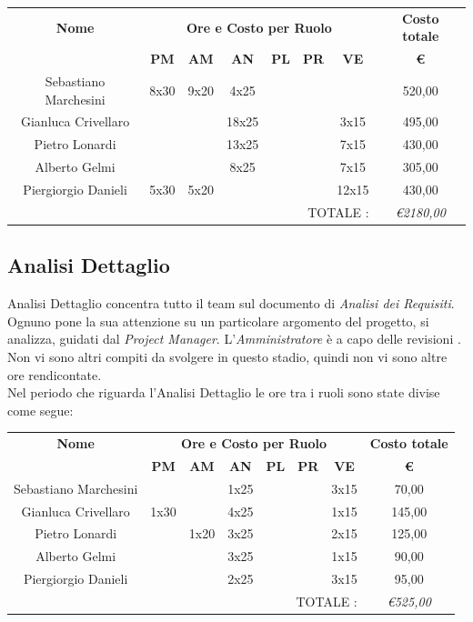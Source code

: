 \documentclass[12pt,a4paper,titlepage]{article}
\begin{document}
	{\renewcommand\arraystretch{1.2}  %
		\begin{tabular}{|c|c|c|c|c|c|c|c|}
			\hline 
			\textbf{Nome} & \multicolumn{6}{c|}{\textbf{Ore e Costo per Ruolo}} & \textbf{Costo totale} \\ 
			& \textbf{PM} & \textbf{AM} & \textbf{AN} & \textbf{PL} & \textbf{PR} & \textbf{VE} & \textbf{ \euro } \\ 
			\hline
			Sebastiano Marchesini & 8x30 & 9x20 & 4x25 &  &  &  & 520,00 \\ 
			\hline 
			Gianluca Crivellaro &  &  & 18x25 &  &  & 3x15 & 495,00  \\ 
			\hline 
			Pietro Lonardi &  &  & 13x25 &  &  & 7x15 & 430,00 \\ 
			\hline 
			Alberto Gelmi &  &  & 8x25 &  &  & 7x15 & 305,00 \\ 
			\hline 
			Piergiorgio Danieli & 5x30 & 5x20 &  &  &  & 12x15 & 430,00 \\ 
			\hline 
			\multicolumn{7}{r|}{TOTALE  :} & \textit{\euro 2180,00} \\ 
	\end{tabular}} 
	
	\subsection{Analisi Dettaglio}
	Analisi Dettaglio concentra tutto il team sul documento di \textit{Analisi dei Requisiti}. Ognuno pone la sua attenzione su un particolare argomento del progetto, si analizza, guidati dal \textit{Project Manager}. L'\textit{Amministratore} è a capo delle revisioni . Non vi sono altri compiti da svolgere in questo stadio, quindi non vi sono altre ore rendicontate.\\
	Nel periodo che riguarda l'Analisi Dettaglio le ore tra i ruoli sono state divise come segue:\\
	
	{\renewcommand\arraystretch{1.2}  %
		\begin{tabular}{|c|c|c|c|c|c|c|c|}
			\hline 
			\textbf{Nome} & \multicolumn{6}{c|}{\textbf{Ore e Costo per Ruolo}} & \textbf{Costo totale} \\ 
			& \textbf{PM} & \textbf{AM} & \textbf{AN} & \textbf{PL} & \textbf{PR} & \textbf{VE} & \textbf{ \euro } \\ 
			\hline
			Sebastiano Marchesini &  &  & 1x25 &  &  & 3x15 & 70,00 \\ 
			\hline 
			Gianluca Crivellaro & 1x30 &  & 4x25 &  &  & 1x15 & 145,00 \\ 
			\hline 
			Pietro Lonardi &  & 1x20 & 3x25 &  &  & 2x15 & 125,00 \\ 
			\hline 
			Alberto Gelmi &  &  & 3x25 &  &  & 1x15 & 90,00 \\ 
			\hline 
			Piergiorgio Danieli &  &  & 2x25 &  &  & 3x15 & 95,00 \\ 
			\hline 
			\multicolumn{7}{r|}{TOTALE  :} & \textit{\euro 525,00} \\ 
	\end{tabular}} 
	
\end{document}
